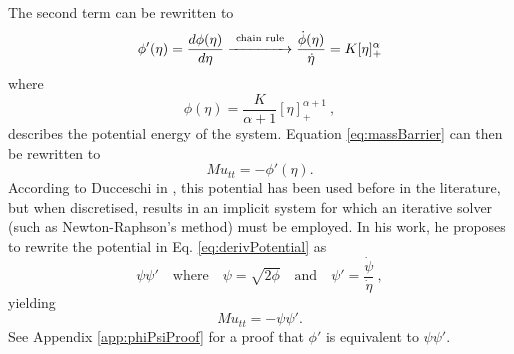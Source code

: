 \documentclass{article}
\begin{document}
\noindent The second term can be rewritten to 
\begin{equation}\label{eq:derivPotential}
    \phi'(\eta) = \frac{d\phi(\eta)}{d\eta}\overset{\text{chain rule}}{\xrightarrow{\hspace*{1.4cm}}}  \frac{\dot{\phi}(\eta)}{\dot{\eta}} =  K[\eta]_+^\alpha
\end{equation}
where
\begin{equation}\label{eq:potential}
    \phi(\eta) = \frac{K}{\alpha+1}[\eta]_+^{\alpha + 1}\ ,
\end{equation}
describes the potential energy of the system. Equation \eqref{eq:massBarrier} can then be rewritten to
\begin{equation}
    Mu_{tt} = -\phi'(\eta).
\end{equation}
According to Ducceschi in \cite{Ducceschi2019}, this potential has been used before in the literature, but when discretised, results in an implicit system for which an iterative solver (such as Newton-Raphson's method) must be employed. In his work, he proposes to rewrite the potential in Eq. \eqref{eq:derivPotential} as
\begin{equation}
    \psi\psi' \quad \text{where} \quad \psi = \sqrt{2\phi} \quad \text{and} \quad \psi' = \frac{\dot{\psi}}{\dot{\eta}}\ ,
\end{equation}
yielding
\begin{equation}\label{eq:massBarrierPsi}
    Mu_{tt}=-\psi\psi'.
\end{equation}
See Appendix \ref{app:phiPsiProof} for a proof that $\phi'$ is equivalent to $\psi\psi'$.
\end{document}
